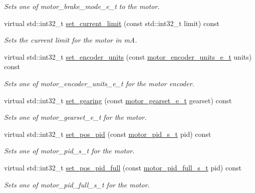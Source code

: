 \begin{DoxyCompactItemize}
\begin{DoxyCompactList}\small\item\em Sets one of motor\+\_\+brake\+\_\+mode\+\_\+e\+\_\+t to the motor. \end{DoxyCompactList}\item 
virtual std\+::int32\+\_\+t \hyperlink{classpros_1_1Motor_a4c496dfb0b33f989d7329a61b7b6d6ba}{set\+\_\+current\+\_\+limit} (const std\+::int32\+\_\+t limit) const
\begin{DoxyCompactList}\small\item\em Sets the current limit for the motor in mA. \end{DoxyCompactList}\item 
virtual std\+::int32\+\_\+t \hyperlink{classpros_1_1Motor_a2d2fea8d5967d1e41471111aa89afd84}{set\+\_\+encoder\+\_\+units} (const \hyperlink{motors_8h_a6677ba23760c558fd8b7b4e1e00a6123}{motor\+\_\+encoder\+\_\+units\+\_\+e\+\_\+t} units) const
\begin{DoxyCompactList}\small\item\em Sets one of motor\+\_\+encoder\+\_\+units\+\_\+e\+\_\+t for the motor encoder. \end{DoxyCompactList}\item 
virtual std\+::int32\+\_\+t \hyperlink{classpros_1_1Motor_a3adf8b737ad2e4ebb5f000401c536fed}{set\+\_\+gearing} (const \hyperlink{motors_8h_aa2f1c305c998abc3bf8dd1f76fa4da8b}{motor\+\_\+gearset\+\_\+e\+\_\+t} gearset) const
\begin{DoxyCompactList}\small\item\em Sets one of motor\+\_\+gearset\+\_\+e\+\_\+t for the motor. \end{DoxyCompactList}\item 
virtual std\+::int32\+\_\+t \hyperlink{classpros_1_1Motor_a7a42563b94124faebb50e5731d5664ad}{set\+\_\+pos\+\_\+pid} (const \hyperlink{motors_8h_ad2e907c8d7ce53c1fd91f1b9801072e3}{motor\+\_\+pid\+\_\+s\+\_\+t} pid) const
\begin{DoxyCompactList}\small\item\em Sets one of motor\+\_\+pid\+\_\+s\+\_\+t for the motor. \end{DoxyCompactList}\item 
virtual std\+::int32\+\_\+t \hyperlink{classpros_1_1Motor_a67cff0666b34c3731e21e856414c2066}{set\+\_\+pos\+\_\+pid\+\_\+full} (const \hyperlink{motors_8h_a0295cbf49f5c70c17b5fa962bd25febd}{motor\+\_\+pid\+\_\+full\+\_\+s\+\_\+t} pid) const
\begin{DoxyCompactList}\small\item\em Sets one of motor\+\_\+pid\+\_\+full\+\_\+s\+\_\+t for the motor. \end{DoxyCompactList}\item 

\end{DoxyCompactItemize}
